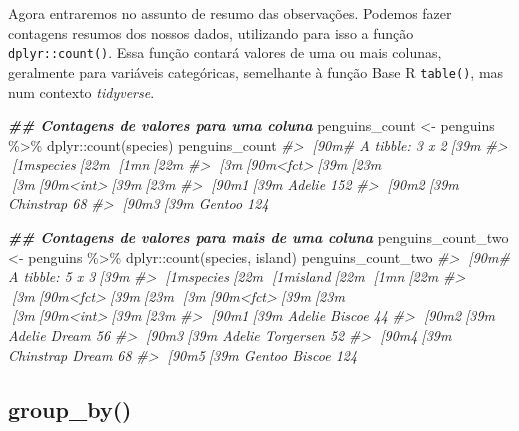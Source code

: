\documentclass[
]{book}
\newenvironment{Shaded}{\begin{snugshade}}{\end{snugshade}}
\newcommand{\CommentTok}[1]{\textcolor[rgb]{0.37,0.37,0.37}{\textit{#1}}}
\newcommand{\DocumentationTok}[1]{\textcolor[rgb]{0.37,0.37,0.37}{\textbf{\textit{#1}}}}
\newcommand{\FunctionTok}[1]{\textcolor[rgb]{0,0,0}{#1}}
\newcommand{\NormalTok}[1]{#1}
\newcommand{\OtherTok}[1]{\textcolor[rgb]{0.37,0.37,0.37}{#1}}
\newcommand{\SpecialCharTok}[1]{\textcolor[rgb]{0,0,0}{#1}}
\begin{document}
Agora entraremos no assunto de resumo das observações. Podemos fazer contagens resumos dos nossos dados, utilizando para isso a função \texttt{dplyr::count()}. Essa função contará valores de uma ou mais colunas, geralmente para variáveis categóricas, semelhante à função Base R \texttt{table()}, mas num contexto \emph{tidyverse}.

\begin{Shaded}
\begin{Highlighting}[]
\DocumentationTok{\#\# Contagens de valores para uma coluna}
\NormalTok{penguins\_count }\OtherTok{\textless{}{-}}\NormalTok{ penguins }\SpecialCharTok{\%\textgreater{}\%} 
\NormalTok{  dplyr}\SpecialCharTok{::}\FunctionTok{count}\NormalTok{(species)}
\NormalTok{penguins\_count}
\CommentTok{\#\textgreater{} [90m\# A tibble: 3 x 2[39m}
\CommentTok{\#\textgreater{}   [1mspecies[22m       [1mn[22m}
\CommentTok{\#\textgreater{}   [3m[90m\textless{}fct\textgreater{}[39m[23m     [3m[90m\textless{}int\textgreater{}[39m[23m}
\CommentTok{\#\textgreater{} [90m1[39m Adelie      152}
\CommentTok{\#\textgreater{} [90m2[39m Chinstrap    68}
\CommentTok{\#\textgreater{} [90m3[39m Gentoo      124}

\DocumentationTok{\#\# Contagens de valores para mais de uma coluna}
\NormalTok{penguins\_count\_two }\OtherTok{\textless{}{-}}\NormalTok{ penguins }\SpecialCharTok{\%\textgreater{}\%} 
\NormalTok{  dplyr}\SpecialCharTok{::}\FunctionTok{count}\NormalTok{(species, island)}
\NormalTok{penguins\_count\_two}
\CommentTok{\#\textgreater{} [90m\# A tibble: 5 x 3[39m}
\CommentTok{\#\textgreater{}   [1mspecies[22m   [1misland[22m        [1mn[22m}
\CommentTok{\#\textgreater{}   [3m[90m\textless{}fct\textgreater{}[39m[23m     [3m[90m\textless{}fct\textgreater{}[39m[23m     [3m[90m\textless{}int\textgreater{}[39m[23m}
\CommentTok{\#\textgreater{} [90m1[39m Adelie    Biscoe       44}
\CommentTok{\#\textgreater{} [90m2[39m Adelie    Dream        56}
\CommentTok{\#\textgreater{} [90m3[39m Adelie    Torgersen    52}
\CommentTok{\#\textgreater{} [90m4[39m Chinstrap Dream        68}
\CommentTok{\#\textgreater{} [90m5[39m Gentoo    Biscoe      124}
\end{Highlighting}
\end{Shaded}

\hypertarget{group_by}{%
\subsection{group\_by()}\label{group_by}}
\end{document}
